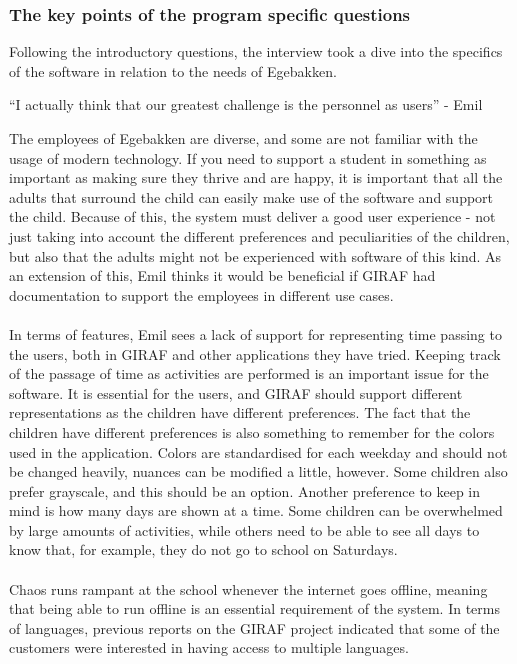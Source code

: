 \subsubsection{The key points of the program specific questions}
Following the introductory questions, the interview took a dive into the specifics of the software in relation to the needs of Egebakken.
\begin{displayquote}
    ``I actually think that our greatest challenge is the personnel as users''  - Emil
\end{displayquote}
The employees of Egebakken are diverse, and some are not familiar with the usage of modern technology.
If you need to support a student in something as important as making sure they thrive and are happy, it is important that all the adults that surround the child can easily make use of the software and support the child.
Because of this, the system must deliver a good user experience - not just taking into account the different preferences and peculiarities of the children, but also that the adults might not be experienced with software of this kind.
As an extension of this, Emil thinks it would be beneficial if GIRAF had documentation to support the employees in different use cases.
\\\\
In terms of features, Emil sees a lack of support for representing time passing to the users, both in GIRAF and other applications they have tried.
Keeping track of the passage of time as activities are performed is an important issue for the software.
It is essential for the users, and GIRAF should support different representations as the children have different preferences.
The fact that the children have different preferences is also something to remember for the colors used in the application.
Colors are standardised for each weekday and should not be changed heavily, nuances can be modified a little, however.
Some children also prefer grayscale, and this should be an option.
Another preference to keep in mind is how many days are shown at a time.
Some children can be overwhelmed by large amounts of activities, while others need to be able to see all days to know that, for example, they do not go to school on Saturdays.
\\\\
Chaos runs rampant at the school whenever the internet goes offline, meaning that being able to run offline is an essential requirement of the system.
In terms of languages, previous reports on the GIRAF project indicated that some of the customers were interested in having access to multiple languages.
